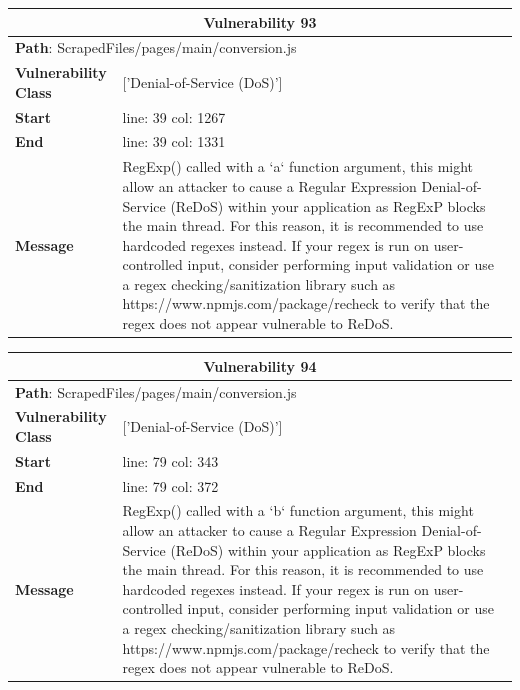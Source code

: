 \documentclass[12pt]{article}
\begin{document}
\vspace{0.7cm}
\FloatBarrier
\begin{table}[!h]
\centering
\renewcommand{\arraystretch}{1.3}
\begin{tabular}{|l|p{10cm}|}
\hline
\multicolumn{2}{|c|}{\textbf{Vulnerability 93}} \\
\hline
\multicolumn{2}{|l|}{\textbf{Path}: ScrapedFiles/pages/main/conversion.js} \\
\hline
\textbf{Vulnerability Class} & ['Denial-of-Service (DoS)'] \\
\hline
\textbf{Start} & line: 39 \quad col: 1267 \\
\hline
\textbf{End} & line: 39 \quad col: 1331 \\
\hline
\textbf{Message} & RegExp() called with a `a` function argument, this might allow an attacker to cause a Regular Expression Denial-of-Service (ReDoS) within your application as RegExP blocks the main thread. For this reason, it is recommended to use hardcoded regexes instead. If your regex is run on user-controlled input, consider performing input validation or use a regex checking/sanitization library such as https://www.npmjs.com/package/recheck to verify that the regex does not appear vulnerable to ReDoS. \\
\hline
\end{tabular}
\end{table}
\vspace{0.7cm}
\FloatBarrier
\begin{table}[!h]
\centering
\renewcommand{\arraystretch}{1.3}
\begin{tabular}{|l|p{10cm}|}
\hline
\multicolumn{2}{|c|}{\textbf{Vulnerability 94}} \\
\hline
\multicolumn{2}{|l|}{\textbf{Path}: ScrapedFiles/pages/main/conversion.js} \\
\hline
\textbf{Vulnerability Class} & ['Denial-of-Service (DoS)'] \\
\hline
\textbf{Start} & line: 79 \quad col: 343 \\
\hline
\textbf{End} & line: 79 \quad col: 372 \\
\hline
\textbf{Message} & RegExp() called with a `b` function argument, this might allow an attacker to cause a Regular Expression Denial-of-Service (ReDoS) within your application as RegExP blocks the main thread. For this reason, it is recommended to use hardcoded regexes instead. If your regex is run on user-controlled input, consider performing input validation or use a regex checking/sanitization library such as https://www.npmjs.com/package/recheck to verify that the regex does not appear vulnerable to ReDoS. \\
\hline
\end{tabular}
\end{table}
\end{document}
